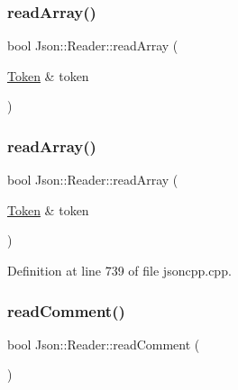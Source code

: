 \subsubsection{\texorpdfstring{read\+Array()}{readArray()}\hspace{0.1cm}{\footnotesize\ttfamily [1/2]}}
{\footnotesize\ttfamily bool Json\+::\+Reader\+::read\+Array (\begin{DoxyParamCaption}\item[{\hyperlink{class_json_1_1_reader_1_1_token}{Token} \&}]{token }\end{DoxyParamCaption})\hspace{0.3cm}{\ttfamily [private]}}

\hypertarget{class_json_1_1_reader_afd9a30c0af205c9f327613f486fae6b8}{}\label{class_json_1_1_reader_afd9a30c0af205c9f327613f486fae6b8} 
\subsubsection{\texorpdfstring{read\+Array()}{readArray()}\hspace{0.1cm}{\footnotesize\ttfamily [2/2]}}
{\footnotesize\ttfamily bool Json\+::\+Reader\+::read\+Array (\begin{DoxyParamCaption}\item[{\hyperlink{class_json_1_1_reader_1_1_token}{Token} \&}]{token }\end{DoxyParamCaption})\hspace{0.3cm}{\ttfamily [private]}}



Definition at line 739 of file jsoncpp.\+cpp.

\hypertarget{class_json_1_1_reader_ad2690e860a1b3332c5401fb0850ba065}{}\label{class_json_1_1_reader_ad2690e860a1b3332c5401fb0850ba065} 
\subsubsection{\texorpdfstring{read\+Comment()}{readComment()}\hspace{0.1cm}{\footnotesize\ttfamily [1/2]}}
{\footnotesize\ttfamily bool Json\+::\+Reader\+::read\+Comment (\begin{DoxyParamCaption}{ }\end{DoxyParamCaption})\hspace{0.3cm}{\ttfamily [private]}}


